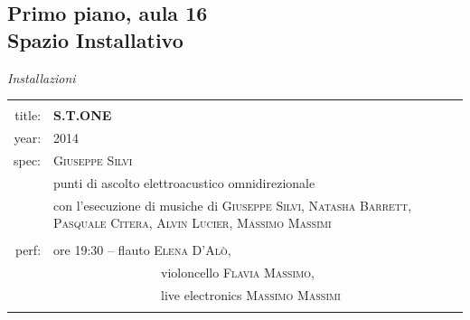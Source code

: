 \documentclass[9pt, twoside, a5paper]{extreport}
\begin{document}
\subsection*{\textsf{Primo piano, aula 16\\
	{\small Spazio Installativo\\}}}

{\fontsize{30}{30}\selectfont \textit{Installazioni}}
\bigskip

\noindent
\begin{tabular}{r|p{10cm}}
								&			\\
\textsf{title:}					&			\textbf{S.T.ONE}						\\
\textsf{year:}					&			2014								\\
\textsf{spec:}					&			\textsc{Giuseppe Silvi} 				\\
								&			punti di ascolto elettroacustico omnidirezionale\\
								& 			con l’esecuzione di musiche di \textsc{Giuseppe Silvi}, \textsc{Natasha Barrett}, \textsc{Pasquale Citera}, \textsc{Alvin Lucier}, \textsc{Massimo Massimi}\\
					&			\\
\textsf{perf:}						& ore 19:30 -- flauto \textsc{Elena D'Alò},  \\
								& \ \ \ \ \ \ \ \ \ \ \ \ \ \ \ \ \ violoncello \textsc{Flavia Massimo},			\\ 
								& \ \ \ \ \ \ \ \ \ \ \ \ \ \ \ \ \ live electronics \textsc{Massimo Massimi}		\\ 
																								&			\\ %
\hline
\hline

\end{tabular}

\bigskip
\end{document}
